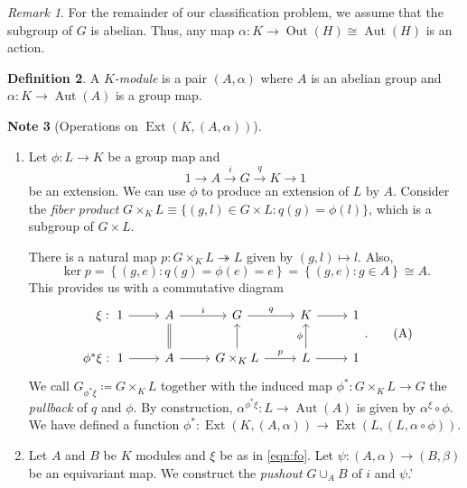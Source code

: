 \documentclass[10pt,letterpaper,cm]{nupset}
\theoremstyle{definition}
\newtheorem{definition}{Definition}[subsection]
\newtheorem{note}[definition]{Note}
\theoremstyle{theorem}
\theoremstyle{remark}
\newtheorem{remark}[definition]{Remark}
\newcommand{\1}{\mathbf{1}}
\newcommand{\0}{\vec 0}
\DeclareMathOperator{\aut}{Aut}
\DeclareMathOperator{\ext}{Ext}
\DeclareMathOperator{\out}{Out}
\begin{document}
\begin{remark}
 For the remainder of our classification problem, we assume that the subgroup of $G$ is abelian. Thus, any map $\alpha : K \to \out(H)\cong \aut(H)$ is an action.
\end{remark}

\begin{definition}
A \textit{$K$-module} is a pair $\left(A, \alpha\right)$ where $A$ is an abelian group and $\alpha : K \to \aut(A)$ is a group map.
\end{definition}
\pagebreak
\begin{note}[Operations on $\ext(K, (A, \alpha))$] $ $
\begin{enumerate}[label=(\arabic*)]
\item Let $\phi  : L \to K$ be a group map and $$1 \to A \overset{i}{\longrightarrow} G \overset{q}{\longrightarrow} K \to 1$$ be an extension. We can use $\phi$ to produce an extension of $L$ by $A$. Consider the \textit{fiber product} $G \times_K L \equiv \{(g, l) \in G \times L : q(g) = \phi(l)\}$, which is a subgroup of $G \times L$.

There is a natural map $p: G\times_K L \twoheadrightarrow L$ given by $\left(g, l\right) \mapsto l$. Also, $$\ker{p} = \left\{\left(g, e\right) : q(g) = \phi(e) =e \right\} = \left\{\left(g, e\right) : g \in A\right\} \cong A.$$ This provides us with a commutative diagram
\[ \label{eqn:fo}
\begin{tikzcd}
\quad \xi:\ 1 \arrow[r] & A \arrow[r, "i"] & G \arrow[r, "q"] & K \arrow[r] & 1 \\
\phi^{\ast}\xi :\ 1 \arrow[r] & A \arrow[r] \arrow[u, equal] & G\times_K L \arrow[r, "p"] \arrow[u] & L \arrow[u, "\phi"] \arrow[r] & 1
\end{tikzcd}. \tag{A}
\]
We call $G_{\phi^{\ast}\xi}\coloneqq  G\times_{K}L$ together with the induced map $\phi^{\ast} : G\times_{K}L\to G$ the \textit{pullback} of $q$ and $\phi$.  By construction, $\alpha^{\phi^{\ast}\xi} : L \to \aut(A)$ is given by $\alpha^{\xi} \circ \phi$. We have defined a function $\phi^{\ast} : \ext(K, (A, \alpha)) \to \ext(L, (L, \alpha \circ \phi))$. 

\item Let $A$ and $B$ be $K$ modules and $\xi$ be as in \eqref{eqn:fo}. Let $\psi: (A, \alpha) \to (B, \beta)$ be an equivariant map. We construct the \textit{pushout} $G \cup_A B$ of $i$ and $\psi$.'


\end{enumerate}
\end{note}
\end{document}
